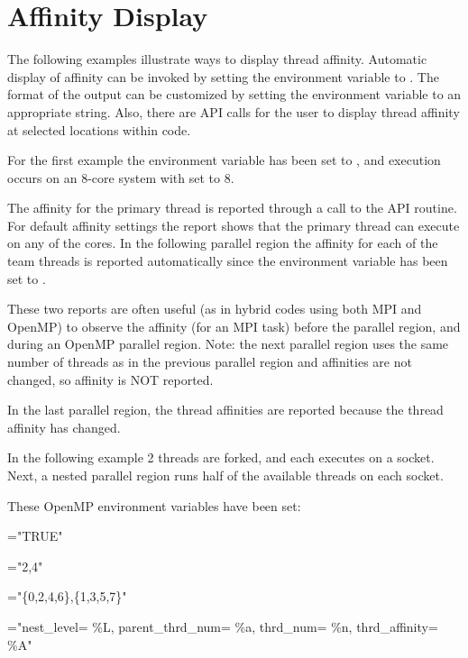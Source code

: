 \section{Affinity Display}
\label{sec:affinity_display}

The following examples illustrate ways to display thread affinity.
Automatic display of affinity can be invoked by setting
the  environment variable to .  
The format of the output can be customized by setting the 
 environment variable to an appropriate string.  
Also, there are API calls for the user to display thread affinity 
at selected locations within code.

For the first example the environment variable  has been
set to , and execution occurs on an 8-core system with  set to 8.

The affinity for the primary thread is reported through a call to the API
 routine. For default affinity settings
the report shows that the primary thread can execute on any of the cores. 
In the following parallel region the affinity for each of the team threads is reported
automatically since the  environment variable has been set
to .

These two reports are often useful (as in hybrid codes using both MPI and OpenMP) 
to observe the affinity (for an MPI task) before the parallel region,
and during an OpenMP parallel region. Note: the next parallel region uses the 
same number of threads as in the previous parallel region and affinities are 
not changed, so affinity is NOT reported.

In the last parallel region, the thread affinities are reported
because the thread affinity has changed.




In the following example 2 threads are forked, and each executes on a socket. Next,
a nested parallel region runs half of the available threads on each socket.

These OpenMP environment variables have been set:

\begin{compactitem}
\item {}="TRUE"
\item {}="2,4"
\item {}="\{0,2,4,6\},\{1,3,5,7\}"
\item {}="nest\_level= \%L, parent\_thrd\_num= \%a, thrd\_num= \%n, thrd\_affinity= \%A"
\end{compactitem}

